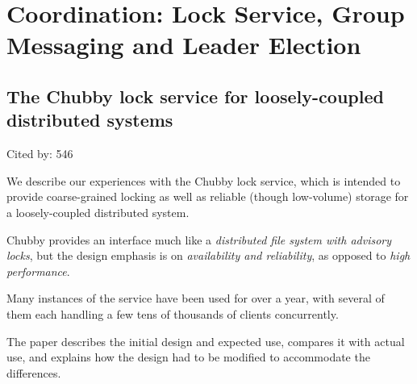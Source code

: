 \documentclass[a4paper,11pt]{article}
\begin{document}
\section{Coordination: Lock Service, Group Messaging and Leader Election}

\subsection*{The Chubby lock service for loosely-coupled distributed systems}
{\color{cyan} {\color{magenta} Cited by: 546}

We describe our experiences with the 
{\color{black} Chubby lock service\cite{chubby}}, 
which is intended to provide 
coarse-grained locking as well as reliable (though low-volume) 
storage for a loosely-coupled distributed system. 

Chubby provides an interface much like a 
{\em distributed file system with advisory locks}, 
but the design emphasis is on 
{\em availability and reliability}, 
as opposed to 
{\em high performance}. 

Many instances of the service have been used for over a year,
with several of them each handling a few tens of thousands of clients concurrently. 

The paper 
describes the initial design and expected use, 
compares it with actual use, and 
explains how the design had to be modified to accommodate the differences.	

}
\end{document}
